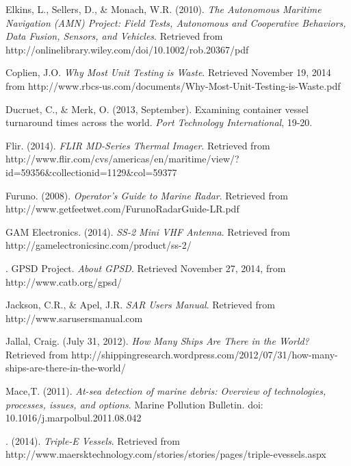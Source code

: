 \begin{thebibliography}{99}
\raggedright


 Elkins, L., Sellers, D., \& Monach, W.R. (2010). \textit{The Autonomous Maritime Navigation (AMN) Project: Field Tests, Autonomous and Cooperative Behaviors, Data Fusion, Sensors, and Vehicles}. Retrieved from http://onlinelibrary.wiley.com/doi/10.1002/rob.20367/pdf

 Coplien, J.O. \textit{Why Most Unit Testing is Waste}. Retrieved November 19, 2014 from http://www.rbcs-us.com/documents/Why-Most-Unit-Testing-is-Waste.pdf

 Ducruet, C., \& Merk, O. (2013, September). Examining container vessel turnaround times across the world. \textit{Port Technology International}, 19-20.

 Flir. (2014). \textit{FLIR MD-Series Thermal Imager}. Retrieved from http://www.flir.com/cvs/americas/en/maritime/view/?id=59356\&collectionid=1129\&col=59377

 Furuno. (2008). \textit{Operator's Guide to Marine Radar}. Retrieved from http://www.getfeetwet.com/FurunoRadarGuide-LR.pdf

 GAM Electronics. (2014). \textit{SS-2 Mini VHF Antenna}. Retrieved from http://gamelectronicsinc.com/product/ss-2/

. GPSD Project. \textit{About GPSD}. Retrieved November 27, 2014, from http://www.catb.org/gpsd/

 Jackson, C.R., \& Apel, J.R. \textit{SAR Users Manual}. Retrieved from http://www.sarusersmanual.com

 Jallal, Craig. (July 31, 2012). \textit{How Many Ships Are There in the World?} Retrieved from http://shippingresearch.wordpress.com/2012/07/31/how-many-ships-are-there-in-the-world/

 Mace,T. (2011). \textit{At-sea detection of marine debris: Overview of technologies, processes, issues, and options}. Marine Pollution Bulletin. doi: 10.1016/j.marpolbul.2011.08.042

. (2014). \textit{Triple-E Vessels}. Retrieved from http://www.maersktechnology.com/stories/stories/pages/triple-evessels.aspx


\end{thebibliography}
